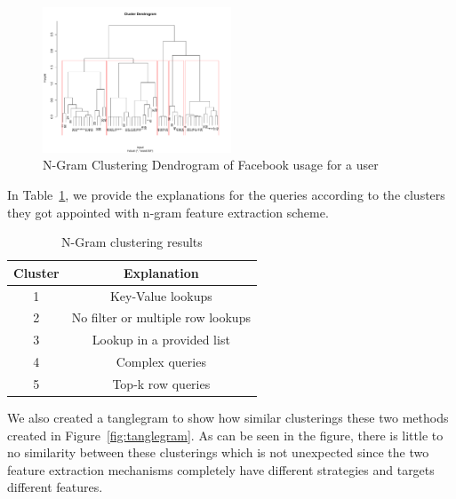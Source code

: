 \begin{figure}[h!]
    \centering
    \includegraphics[width=0.5\textwidth]{graphics/Ngram}
    \caption{N-Gram Clustering Dendrogram of Facebook usage for a user}
    \label{fig:ngram}
\end{figure}

In Table~\ref{tab:clusteringresultngram}, we provide the explanations for the queries according to the clusters they got appointed with n-gram feature extraction scheme.

\begin{table}[h!]
\centering
\caption{N-Gram clustering results}
\label{tab:clusteringresultngram}
\begin{tabular}{|c|c|}
\hline
Cluster & Explanation                       \\ \hline
1       & Key-Value lookups                 \\ \hline
2       & No filter or multiple row lookups \\ \hline
3       & Lookup in a provided list         \\ \hline
4       & Complex queries                   \\ \hline
5       & Top-k row queries                 \\ \hline
\end{tabular}
\end{table}

We also created a tanglegram to show how similar clusterings these two methods created in Figure~\ref{fig:tanglegram}. As can be seen in the figure, there is little to no similarity between these clusterings which is not unexpected since the two feature extraction mechanisms completely have different strategies and targets different features.

